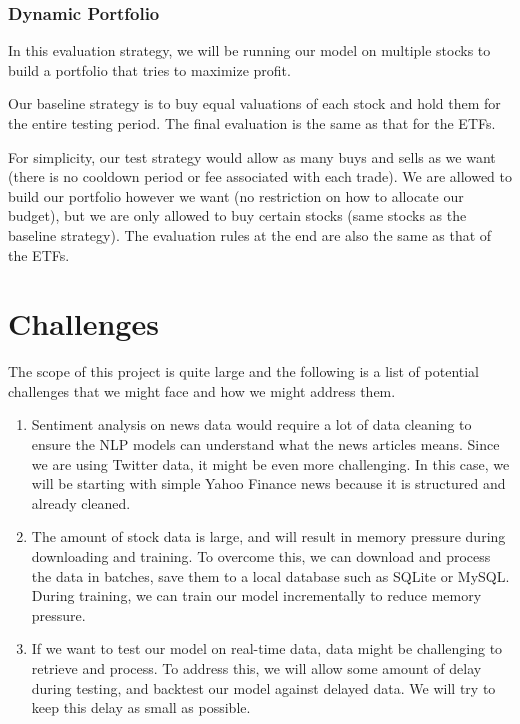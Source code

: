 \documentclass[10pt]{article}
\begin{document}
\subsubsection{Dynamic Portfolio}

In this evaluation strategy, we will be running our model on multiple stocks to build a portfolio that tries to maximize profit.

Our baseline strategy is to buy equal valuations of each stock and hold them for the entire testing period.  The final evaluation is the same as that for the ETFs.

For simplicity, our test strategy would allow as many buys and sells as we want (there is no cooldown period or fee associated with each trade). We are allowed to build our portfolio however we want (no restriction on how to allocate our budget), but we are only allowed to buy certain stocks (same stocks as the baseline strategy). The evaluation rules at the end are also the same as that of the ETFs.


\section{Challenges}

The scope of this project is quite large and the following is a list of potential challenges that we might face and how we might address them.

\begin{enumerate}

\item Sentiment analysis on news data would require a lot of data cleaning to ensure the NLP models can understand what the news articles means. Since we are using Twitter data, it might be even more challenging. In this case, we will be starting with simple Yahoo Finance news because it is structured and already cleaned.

\item The amount of stock data is large, and will result in memory pressure during downloading and training. To overcome this, we can download and process the data in batches, save them to a local database such as SQLite or MySQL. During training, we can train our model incrementally to reduce memory pressure.

\item If we want to test our model on real-time data, data might be challenging to retrieve and process. To address this, we will allow some amount of delay during testing, and backtest our model against delayed data. We will try to keep this delay as small as possible.

\end{enumerate}




\end{document}
